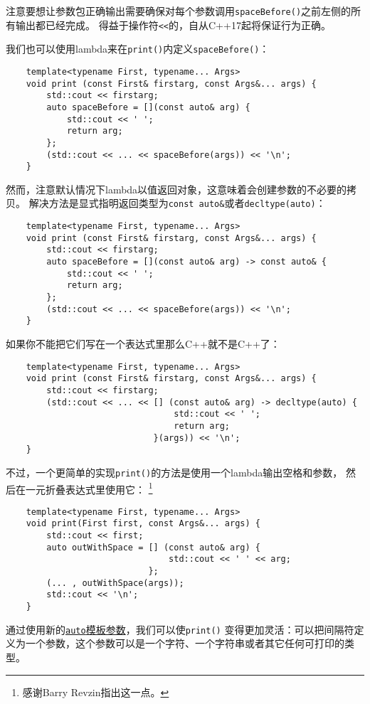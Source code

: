 注意要想让参数包正确输出需要确保对每个参数调用\texttt{spaceBefore()}之前左侧的所有输出都已经完成。
得益于操作符\texttt{<<}的，自从C++17起将保证行为正确。

我们也可以使用lambda来在\texttt{print()}内定义\texttt{spaceBefore()}：
\begin{lstlisting}
    template<typename First, typename... Args>
    void print (const First& firstarg, const Args&... args) {
        std::cout << firstarg;
        auto spaceBefore = [](const auto& arg) {
            std::cout << ' ';
            return arg;
        };
        (std::cout << ... << spaceBefore(args)) << '\n';
    }
\end{lstlisting}
然而，注意默认情况下lambda以值返回对象，这意味着会创建参数的不必要的拷贝。
解决方法是显式指明返回类型为\texttt{const auto\&}或者\texttt{decltype(auto)}：
\begin{lstlisting}
    template<typename First, typename... Args>
    void print (const First& firstarg, const Args&... args) {
        std::cout << firstarg;
        auto spaceBefore = [](const auto& arg) -> const auto& {
            std::cout << ' ';
            return arg;
        };
        (std::cout << ... << spaceBefore(args)) << '\n';
    }
\end{lstlisting}
如果你不能把它们写在一个表达式里那么C++就不是C++了：
\begin{lstlisting}
    template<typename First, typename... Args>
    void print (const First& firstarg, const Args&... args) {
        std::cout << firstarg;
        (std::cout << ... << [] (const auto& arg) -> decltype(auto) {
                                 std::cout << ' ';
                                 return arg;
                             }(args)) << '\n';
    }
\end{lstlisting}
不过，一个更简单的实现\texttt{print()}的方法是使用一个lambda输出空格和参数，
然后在一元折叠表达式里使用它：
\footnote{感谢Barry Revzin指出这一点。}
\begin{lstlisting}
    template<typename First, typename... Args>
    void print(First first, const Args&... args) {
        std::cout << first;
        auto outWithSpace = [] (const auto& arg) {
                                std::cout << ' ' << arg;
                            };
        (... , outWithSpace(args));
        std::cout << '\n';
    }
\end{lstlisting}
通过使用新的\hyperref[ch13.1.1]{\texttt{auto}模板参数}，我们可以使\texttt{print()}
变得更加灵活：可以把间隔符定义为一个参数，这个参数可以是一个字符、一个字符串或者其它任何可打印的类型。

